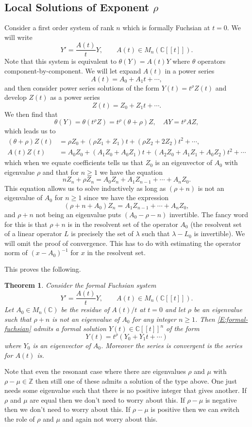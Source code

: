 \documentclass[12pt]{book}
\numberwithin{equation}{section}
\newtheorem{theorem}{Theorem}[subsection]
\theoremstyle{definition}
\theoremstyle{remark}
\newcommand{\ZZ}{\mathbb{Z}}
\newcommand{\CC}{\mathbb{C}}
\begin{document}
\subsection{Local Solutions of Exponent $\rho$}
Consider a first order system of rank $n$ which is formally Fuchsian at $t=0$. 
We will write 
$$ Y' = \frac{A(t)}{t} Y, \qquad A(t) \in M_n(\CC[[t]]).$$
Note that this system is equivalent to $\theta(Y) = A(t) Y$ where $\theta$ operators component-by-component. 
We will let expand $A(t)$ in a power series
$$ A(t) = A_0 + A_1 t + \cdots, $$
and then consider power series solutions of the form $Y(t) = t^{\rho}Z(t)$ and develop $Z(t)$ as a power series 
$$ Z(t) = Z_0 + Z_1 t + \cdots. $$
We then find that 
$$ \theta(Y) = \theta( t^\rho Z) = t^{\rho}(\theta+\rho)Z, \quad AY =  t^\rho A Z, $$
which leads us to  
\begin{align*}
(\theta + \rho)Z(t) &= \rho Z_0 + (\rho Z_1 + Z_1)t + (\rho Z_2 + 2 Z_2)t^2 +\cdots, \\
A(t) Z(t) &= A_0 Z_0 + (A_1Z_0+A_0Z_1)t + (A_2 Z_0 + A_1Z_1+A_0 Z_2)t^2+\cdots 
\end{align*}
which when we equate coefficients tells us that $Z_0$ is an eigenvector of $A_0$ with eigenvalue $\rho$ and that for $n\geq 1$ we have the equation
$$ nZ_n + \rho Z_n = A_0 Z_n + A_1 Z_{n-1} + \cdots + A_n Z_0.$$
This equation allows us to solve inductively as long as $(\rho+n)$ is not an eigenvalue of $A_0$ for $n\geq 1$ since we have the expression
$$( \rho + n + A_0) Z_n = A_1 Z_{n-1} + \cdots + A_n Z_0,$$
and $\rho+n$ not being an eigenvalue puts $(A_0 - \rho-n)$ invertible. 
The fancy word for this is that $\rho+n$ is in the resolvent set of the operator $A_0$ (the resolvent set of a linear operator $L$ is precisely the set of $\lambda$ such that $\lambda-L_0$ is invertible). 
We will omit the proof of convergence. 
This has to do with estimating the operator norm of $(x-A_0)^{-1}$ for $x$ in the resolvent set. 

This proves the following.
\begin{theorem}
	Consider the formal Fuchsian system 
	\begin{equation}\label{E:formal-fuchsian}
	Y' = \frac{A(t)}{t} Y, \qquad A(t) \in M_n(\CC[[t]]).
	\end{equation}
	Let $A_0\in M_n(\CC)$ be the residue of $A(t)/t$ at $t=0$ and let $\rho$ be an eigenvalue such that $\rho+n$ is not an eigenvalue of $A_0$ for any integer $n\geq 1$. 
	Then \eqref{E:formal-fuchsian} admits a formal solution $Y(t) \in \CC[[t]]^n$ of the form 
	$$ Y(t) = t^{\rho}(Y_0 + Y_1 t + \cdots ) $$
	where $Y_0$ is an eigenvector of $A_0$. 
	Moreover the series is convergent is the series for $A(t)$ is. 
\end{theorem}
Note that even the resonant case where there are eigenvalues $\rho$ and $\mu$ with  $\rho-\mu \in \ZZ$ then still one of these admits a solution of the type above. 
One just needs some eigenvalue such that there is no positive integer that gives another. 
If $\rho$ and $\mu$ are equal then we don't need to worry about this. 
If $\rho-\mu$ is negative then we don't need to worry about this. 
If $\rho-\mu$ is positive then we can switch the role of $\rho$ and $\mu$ and again not worry about this. 
\end{document}
